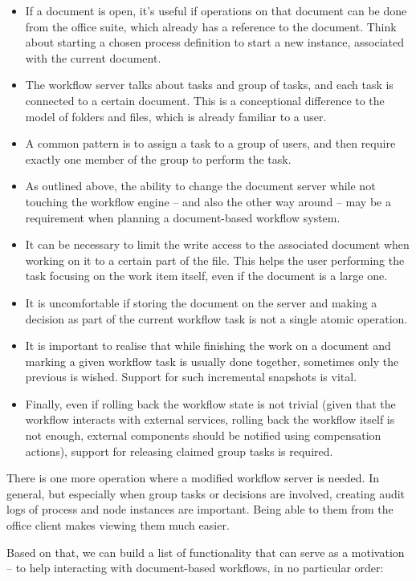 \begin{itemize}
\item If a document is open, it's useful if operations on
that document can be done from the office suite, which already has a reference
to the document. Think about starting a chosen process definition to start a
new instance, associated with the current document.
\item The workflow server talks about tasks and group of tasks, and each task
is connected to a certain document. This is a conceptional difference to the model of
folders and files, which is already familiar to a user.
\item A common pattern is to assign a task to a group of users, and then
require exactly one member of the group to perform the task.
\item As outlined above, the ability to change the document server while not
touching the workflow engine -- and also the other way around -- may be a
requirement when planning a document-based workflow system.
\item It can be necessary to limit the write access to the associated document
when working on it to a certain part of the file. This helps the user
performing the task focusing on the work item itself, even if the document is a
large one.
\item It is uncomfortable if storing the document on the server and making a
decision as part of the current workflow task is not a single atomic operation.
\item It is important to realise that while finishing the work on a document
and marking a given workflow task is usually done together, sometimes only the
previous is wished. Support for such incremental snapshots is vital.
\item Finally, even if rolling back the workflow state is not trivial (given
that the workflow interacts with external services, rolling back the workflow
itself is not enough, external components should be notified using compensation
actions), support for releasing claimed group tasks is required.
\end{itemize}

There is one more operation where a modified workflow server is needed. In
general, but especially when group tasks or decisions are involved, creating
audit logs of process and node instances are important. Being able to them from the
office client makes viewing them much easier.

Based on that, we can build a list of functionality that can serve as a
motivation -- to help interacting with document-based workflows, in no
particular order:

